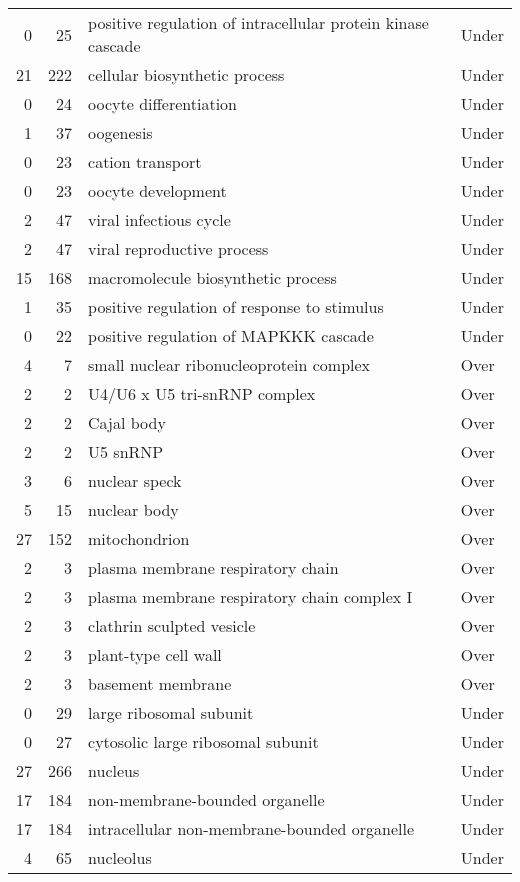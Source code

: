 \documentclass[10pt]{bmc_article}
\newenvironment{bmcformat}{\begin{raggedright}\baselineskip20pt\sloppy\setboolean{publ}{false}}{\end{raggedright}\baselineskip20pt\sloppy}
\begin{document}
\begin{bmcformat}
\begin{longtable}{rrll}
    0 &  25 & positive regulation of intracellular protein kinase cascade & Under \\ 
   21 & 222 & cellular biosynthetic process & Under \\ 
    0 &  24 & oocyte differentiation & Under \\ 
    1 &  37 & oogenesis & Under \\ 
    0 &  23 & cation transport & Under \\ 
    0 &  23 & oocyte development & Under \\ 
    2 &  47 & viral infectious cycle & Under \\ 
    2 &  47 & viral reproductive process & Under \\ 
   15 & 168 & macromolecule biosynthetic process & Under \\ 
    1 &  35 & positive regulation of response to stimulus & Under \\ 
    0 &  22 & positive regulation of MAPKKK cascade & Under \\ 
   \hline
  4 &   7 & small nuclear ribonucleoprotein complex & Over \\ 
    2 &   2 & U4/U6 x U5 tri-snRNP complex & Over \\ 
    2 &   2 & Cajal body & Over \\ 
    2 &   2 & U5 snRNP & Over \\ 
    3 &   6 & nuclear speck & Over \\ 
    5 &  15 & nuclear body & Over \\ 
   27 & 152 & mitochondrion & Over \\ 
    2 &   3 & plasma membrane respiratory chain & Over \\ 
    2 &   3 & plasma membrane respiratory chain complex I & Over \\ 
    2 &   3 & clathrin sculpted vesicle & Over \\ 
    2 &   3 & plant-type cell wall & Over \\ 
    2 &   3 & basement membrane & Over \\ 
    0 &  29 & large ribosomal subunit & Under \\ 
    0 &  27 & cytosolic large ribosomal subunit & Under \\ 
   27 & 266 & nucleus & Under \\ 
   17 & 184 & non-membrane-bounded organelle & Under \\ 
   17 & 184 & intracellular non-membrane-bounded organelle & Under \\ 
    4 &  65 & nucleolus & Under \\ 
   \hline
\hline
\end{longtable}

\end{bmcformat}
\end{document}
